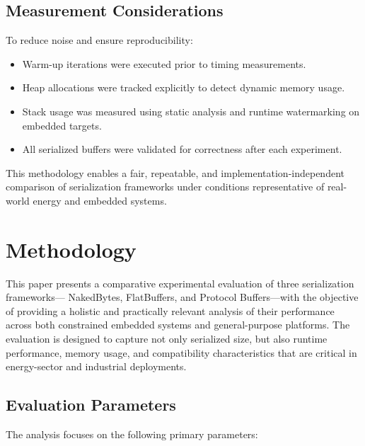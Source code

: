 \documentclass[11pt, a4paper]{article}
\begin{document}
\subsection{Measurement Considerations}

To reduce noise and ensure reproducibility:
\begin{itemize}
    \item Warm-up iterations were executed prior to timing measurements.
    \item Heap allocations were tracked explicitly to detect dynamic memory usage.
    \item Stack usage was measured using static analysis and runtime watermarking on embedded targets.
    \item All serialized buffers were validated for correctness after each experiment.
\end{itemize}

This methodology enables a fair, repeatable, and implementation-independent comparison of serialization frameworks under conditions representative of real-world energy and embedded systems.
\section{Methodology}

This paper presents a comparative experimental evaluation of three serialization frameworks— NakedBytes, FlatBuffers, and Protocol Buffers—with the objective of providing a holistic and practically relevant analysis of their performance across both constrained embedded systems and general-purpose platforms. The evaluation is designed to capture not only serialized size, but also runtime performance, memory usage, and compatibility characteristics that are critical in energy-sector and industrial deployments.

\subsection{Evaluation Parameters}

The analysis focuses on the following primary parameters:
\end{document}
